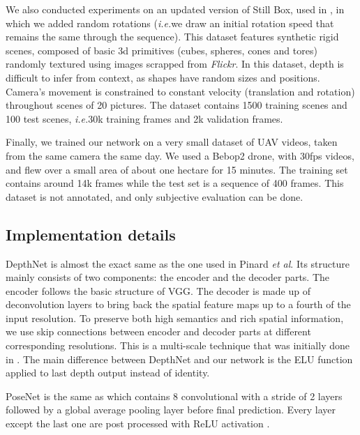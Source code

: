 \documentclass[runningheads]{llncs}
\def\etal{\emph{et al}\:}
\def\ie{\emph{i.e.}\:}
\begin{document}
We also conducted experiments on an updated version of Still Box, used in \cite{isprs-annals-IV-2-W3-67-2017}, in which we added random rotations
(\ie we draw an initial rotation speed that remains the same through the sequence). 
This dataset features synthetic rigid scenes, composed of basic 3d primitives (cubes, spheres, cones and tores) randomly textured using images scrapped from \textit{Flickr}. In this dataset, depth is difficult to infer from context, as shapes have random sizes and positions. Camera's movement is constrained to constant velocity (translation and rotation) throughout scenes of 20 pictures. 
The dataset contains 1500 training scenes and 100 test scenes, \ie 30k training frames and 2k validation frames.

Finally, we trained our network on a very small dataset of UAV videos, taken from the same camera the same day. We used a Bebop2 drone, with 30fps videos, and flew over a small area of about one hectare for 15 minutes.
The training set contains around 14k frames while the test set is a sequence of 400 frames. This dataset is not annotated, and only subjective evaluation can be done. 

\subsection{Implementation details}
DepthNet is almost the exact same as the one used in Pinard \etal \cite{isprs-annals-IV-2-W3-67-2017}. Its structure mainly consists of two components: the encoder and the decoder parts. The encoder follows the basic structure of VGG\cite{Simonyan14c}. The decoder is made up of deconvolution layers to bring back the spatial feature maps up to a fourth of the input resolution.
To preserve both high semantics and rich spatial information, we use skip connections between encoder and decoder parts at different corresponding resolutions. This is a multi-scale technique that was initially done in \cite{DFIB15}.
The main difference between DepthNet and our network is the ELU function \cite{clevert2015fast} applied to last depth output instead of identity.

PoseNet is the same as 
\cite{zhou2017unsupervised} which contains 8 convolutional with a stride of 2 layers followed by a global average pooling layer before final prediction. Every layer except the last one are post processed with ReLU activation \cite{nair2010rectified}.
\end{document}
